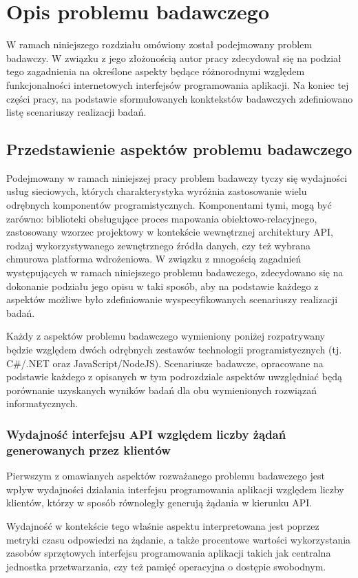\chapter{Opis problemu badawczego}
W ramach niniejszego rozdziału omówiony został podejmowany problem badawczy. W związku z jego złożonością autor pracy zdecydował się na podział tego zagadnienia na określone aspekty będące różnorodnymi względem funkcjonalności internetowych interfejsów programowania aplikacji. Na koniec tej części pracy, na podstawie sformułowanych konktekstów badawczych zdefiniowano listę scenariuszy realizacji badań.
\section{Przedstawienie aspektów problemu badawczego}
Podejmowany w ramach niniejszej pracy problem badawczy tyczy się wydajności usług sieciowych, których charakterystyka wyróżnia zastosowanie wielu odrębnych komponentów programistycznych. Komponentami tymi, mogą być zarówno: biblioteki obsługujące proces mapowania obiektowo-relacyjnego, zastosowany wzorzec projektowy w kontekście wewnętrznej architektury API, rodzaj wykorzystywanego zewnętrznego źródła danych, czy też wybrana chmurowa platforma wdrożeniowa. W związku z mnogością zagadnień występujących w ramach niniejszego problemu badawczego, zdecydowano się na dokonanie podziału jego opisu w taki sposób, aby na podstawie każdego z aspektów możliwe było zdefiniowanie wyspecyfikowanych scenariuszy realizacji badań.

Każdy z aspektów problemu badawczego wymieniony poniżej rozpatrywany będzie względem dwóch odrębnych zestawów technologii programistycznych (tj. C\#/.NET oraz JavaScript/NodeJS). Scenariusze badawcze, opracowane na podstawie każdego z opisanych w tym podrozdziale aspektów uwzględniać będą porównanie uzyskanych wyników badań dla obu wymienionych rozwiązań informatycznych.
\subsection*{Wydajność interfejsu API względem liczby żądań generowanych przez klientów}
Pierwszym z omawianych aspektów rozważanego problemu badawczego jest wpływ wydajności działania interfejsu programowania aplikacji względem liczby klientów, którzy w sposób równoległy generują żądania w kierunku API.

Wydajność w kontekście tego właśnie aspektu interpretowana jest poprzez metryki czasu odpowiedzi na żądanie, a także procentowe wartości wykorzystania zasobów sprzętowych interfejsu programowania aplikacji takich jak centralna jednostka przetwarzania, czy też pamięć operacyjna o dostępie swobodnym.

